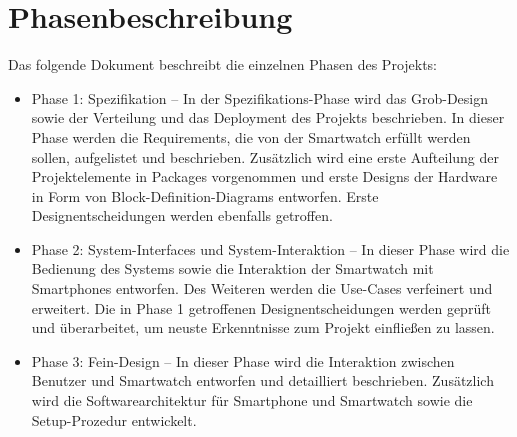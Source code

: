 \section{Phasenbeschreibung}
Das folgende Dokument beschreibt die einzelnen Phasen des Projekts:
\begin{itemize}
  \item Phase 1: Spezifikation -- In der Spezifikations-Phase wird das Grob-Design sowie der Verteilung und das Deployment des Projekts beschrieben. In dieser Phase werden die \glspl{Requirement}, die von der Smartwatch erfüllt werden sollen, aufgelistet und beschrieben. Zusätzlich wird eine erste Aufteilung der Projektelemente in \glspl{Package} vorgenommen und erste Designs der Hardware in Form von Block-Definition-Diagrams entworfen. Erste Designentscheidungen werden ebenfalls getroffen.

  \item Phase 2: System-Interfaces und System-Interaktion -- In dieser Phase wird die Bedienung des Systems sowie die Interaktion der Smartwatch mit Smartphones entworfen. Des Weiteren werden die \glspl{Use-Case} verfeinert und erweitert. Die in Phase 1 getroffenen Designentscheidungen werden geprüft und überarbeitet, um neuste Erkenntnisse zum Projekt einfließen zu lassen.

  \item Phase 3: Fein-Design -- In dieser Phase wird die Interaktion zwischen Benutzer und Smartwatch entworfen und detailliert beschrieben. Zusätzlich wird die Softwarearchitektur für Smartphone und Smartwatch sowie die Setup-Prozedur entwickelt.
\end{itemize}
